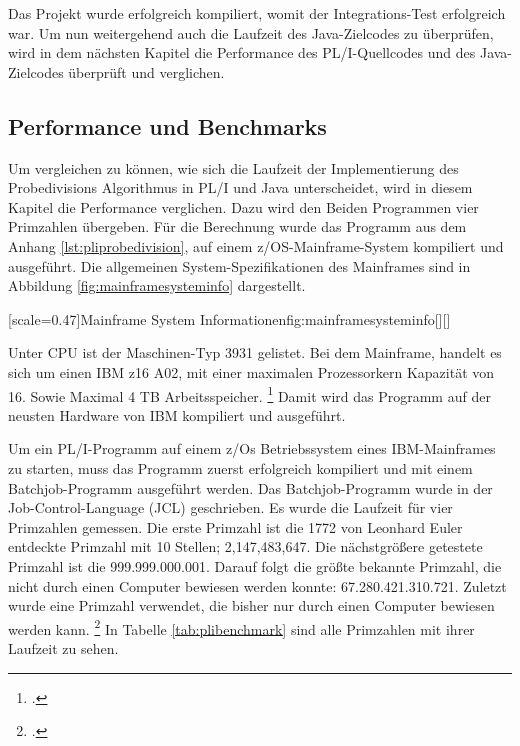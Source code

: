Das Projekt wurde erfolgreich kompiliert, womit der Integrations-Test erfolgreich war. Um nun weitergehend auch die Laufzeit des Java-Zielcodes zu überprüfen, wird in dem nächsten Kapitel die Performance des PL/I-Quellcodes und des Java-Zielcodes überprüft und verglichen. 
\pagebreak


\subsection{Performance und Benchmarks}
Um vergleichen zu können, wie sich die Laufzeit der Implementierung des Probedivisions Algorithmus in PL/I und Java unterscheidet, wird in diesem Kapitel die Performance verglichen. 
Dazu wird den Beiden Programmen vier Primzahlen übergeben. Für die Berechnung wurde das Programm aus dem Anhang \ref{lst:pliprobedivision}, auf einem z/OS-Mainframe-System kompiliert und ausgeführt. 
Die allgemeinen System-Spezifikationen des Mainframes sind in Abbildung \ref{fig:mainframesysteminfo} dargestellt.

[scale=0.47]{Mainframe System Informationen}{fig:mainframesysteminfo}[][]

Unter CPU ist der Maschinen-Typ 3931 gelistet. Bei dem Mainframe, handelt es sich um einen IBM z16 A02, mit
einer maximalen Prozessorkern Kapazität von 16. Sowie Maximal 4 TB Arbeitsspeicher. \footcite{z16}
Damit wird das Programm auf der neusten Hardware von IBM kompiliert und ausgeführt.

Um ein PL/I-Programm auf einem z/Os Betriebssystem eines IBM-Mainframes zu starten, muss das Programm zuerst erfolgreich kompiliert und mit einem Batchjob-Programm
ausgeführt werden. Das Batchjob-Programm wurde in der Job-Control-Language (JCL) geschrieben.
Es wurde die Laufzeit für vier Primzahlen gemessen. Die erste Primzahl ist die 1772 von Leonhard Euler entdeckte Primzahl mit 10 Stellen; 2,147,483,647. Die nächstgrößere getestete Primzahl ist die 999.999.000.001. Darauf folgt die größte bekannte Primzahl, die nicht durch einen Computer bewiesen werden konnte: 67.280.421.310.721. Zuletzt wurde eine Primzahl verwendet, die bisher nur durch einen Computer bewiesen werden kann. \footcite[Vgl. ]{prime}
In Tabelle \ref{tab:plibenchmark} sind alle Primzahlen mit ihrer Laufzeit zu sehen. 

